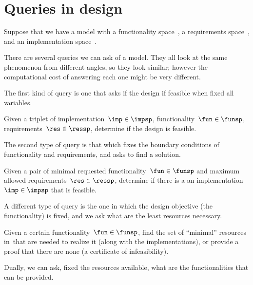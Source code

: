 

\section{Queries in design}


Suppose that we have a model with a functionality space~\funsp, a requirements space~\ressp, and an implementation space~\impsp.

There are several queries we can ask of a model.
They all look at the same phenomenon from different angles, so they look similar;
however the computational cost of answering each one might be very different.


The first kind of query is one that asks if the design if feasible when fixed all variables.

\begin{problem}
    Given a triplet of implementation~$\imp\in\impsp$, functionality~$\fun\in\funsp$, requirements~$\res\in\ressp$, determine if the design is feasible.
\end{problem}

The second type of query is that which fixes the boundary conditions of functionality and requirements, and asks to find a solution.

\begin{problem}
    Given a pair of minimal requested functionality~$\fun\in\funsp$ and maximum allowed requirements~$\res\in\ressp$, determine if there is a an implementation~$\imp\in\impsp$ that is feasible.
\end{problem}

A different type of query is the one in which the design objective (the functionality) is fixed, and we ask what are the least resources necessary.


\begin{problem}[FixFunMinRes]
    \label{prob:FixFunMinRes-informal}
    Given a certain functionality~$\fun\in\funsp$, find the set of ``minimal'' resources in~\ressp that are needed to realize it (along with the implementations), or provide a proof that there are none (a certificate of infeasibility).
\end{problem}


Dually, we can ask, fixed the resources available, what are the functionalities that can be provided.

